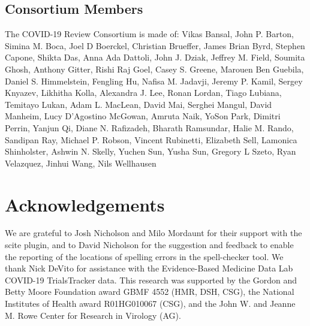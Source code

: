 \documentclass[twocolumn]{ceurart}
\begin{document}
\hypertarget{consortium-members}{%
\subsection*{Consortium Members}\label{consortium-members}}

The COVID-19 Review Consortium is made of:
Vikas Bansal, John P. Barton, Simina M. Boca, Joel D Boerckel, Christian Brueffer, James Brian Byrd, Stephen Capone, Shikta Das, Anna Ada Dattoli, John J. Dziak, Jeffrey M. Field, Soumita Ghosh, Anthony Gitter, Rishi Raj Goel, Casey S. Greene, Marouen Ben Guebila, Daniel S. Himmelstein, Fengling Hu, Nafisa M. Jadavji, Jeremy P. Kamil, Sergey Knyazev, Likhitha Kolla, Alexandra J. Lee, Ronan Lordan, Tiago Lubiana, Temitayo Lukan, Adam L. MacLean, David Mai, Serghei Mangul, David Manheim, Lucy D'Agostino McGowan, Amruta Naik, YoSon Park, Dimitri Perrin, Yanjun Qi, Diane N. Rafizadeh, Bharath Ramsundar, Halie M. Rando, Sandipan Ray, Michael P. Robson, Vincent Rubinetti, Elizabeth Sell, Lamonica Shinholster, Ashwin N. Skelly, Yuchen Sun, Yusha Sun, Gregory L Szeto, Ryan Velazquez, Jinhui Wang, Nils Wellhausen

\hypertarget{acknowledgements}{%
\section*{Acknowledgements}\label{acknowledgements}}

We are grateful to Josh Nicholson and Milo Mordaunt for their support with the scite plugin, and to David Nicholson for the suggestion and feedback to enable the reporting of the locations of spelling errors in the spell-checker tool.
We thank Nick DeVito for assistance with the Evidence-Based Medicine Data Lab COVID-19 TrialsTracker data.
This research was supported by the Gordon and Betty Moore Foundation award GBMF 4552 (HMR, DSH, CSG), the National Institutes of Health award R01HG010067 (CSG), and the John W. and Jeanne M. Rowe Center for Research in Virology (AG).



\end{document}
